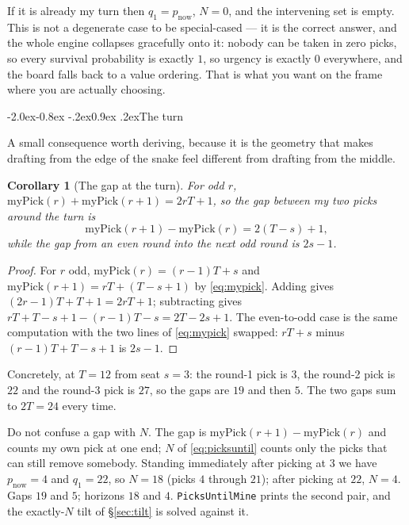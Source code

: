 \documentclass[10pt,a4paper]{article}
\makeatletter
\theoremstyle{plain}
\newtheorem{corollary}[theorem]{Corollary}
\theoremstyle{definition}
\theoremstyle{remark}
\newcommand{\code}[1]{\texttt{\small #1}}
\renewcommand\subsection{\@startsection{subsection}{2}{\z@}%
  {-2.0ex\@plus -0.8ex \@minus -.2ex}{0.9ex \@plus .2ex}{\normalfont\large\bfseries}}
\makeatother
\begin{document}
If it is already my turn then $q_1 = p_{\text{now}}$, $N = 0$, and the intervening set
is empty. This is not a degenerate case to be special-cased --- it is the correct
answer, and the whole engine collapses gracefully onto it: nobody can be taken in zero
picks, so every survival probability is exactly $1$, so urgency is exactly $0$
everywhere, and the board falls back to a value ordering. That is what you want on the
frame where you are actually choosing.

\subsection{The turn}

A small consequence worth deriving, because it is the geometry that makes drafting from
the edge of the snake feel different from drafting from the middle.

\begin{corollary}[The gap at the turn]
\label{cor:turn}
For odd $r$, $\mathrm{myPick}(r) + \mathrm{myPick}(r+1) = 2rT + 1$, so the gap between
my two picks around the turn is
\[
\mathrm{myPick}(r+1) - \mathrm{myPick}(r) = 2(T - s) + 1,
\]
while the gap from an even round into the next odd round is $2s - 1$.
\end{corollary}

\begin{proof}
For $r$ odd, $\mathrm{myPick}(r) = (r-1)T + s$ and $\mathrm{myPick}(r+1) = rT + (T-s+1)$
by \eqref{eq:mypick}. Adding gives $(2r-1)T + T + 1 = 2rT+1$; subtracting gives
$rT + T - s + 1 - (r-1)T - s = 2T - 2s + 1$. The even-to-odd case is the same
computation with the two lines of \eqref{eq:mypick} swapped: $rT + s$ minus
$(r-1)T + T - s + 1$ is $2s-1$.
\end{proof}

Concretely, at $T = 12$ from seat $s = 3$: the round-1 pick is $3$, the round-2 pick is
$22$ and the round-3 pick is $27$, so the gaps are $19$ and then $5$. The two gaps sum to
$2T = 24$ every time.

Do not confuse a gap with $N$. The gap is $\mathrm{myPick}(r+1) - \mathrm{myPick}(r)$ and
counts my own pick at one end; $N$ of \eqref{eq:picksuntil} counts only the picks that can
still remove somebody. Standing immediately after picking at $3$ we have
$p_{\text{now}} = 4$ and $q_1 = 22$, so $N = 18$ (picks $4$ through $21$); after picking at
$22$, $N = 4$. Gaps $19$ and $5$; horizons $18$ and $4$. \code{PicksUntilMine} prints the
second pair, and the exactly-$N$ tilt of \S\ref{sec:tilt} is solved against it.
\end{document}
